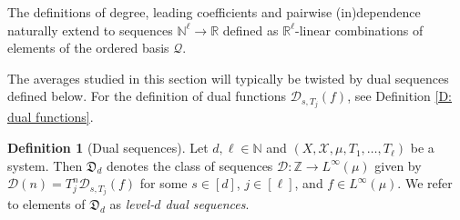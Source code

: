 \documentclass[11pt]{amsart}
\theoremstyle{definition}
\newtheorem{definition}[lemma]{Definition}
\newcommand{\N}{{\mathbb N}}
\newcommand{\R}{{\mathbb R}}
\newcommand{\Z}{{\mathbb Z}}
\newcommand{\CD}{{\mathcal D}}
\newcommand{\CQ}{{\mathcal Q}}
\newcommand{\CX}{{\mathcal X}}
\newcommand{\FD}{{\mathfrak D}}
\newcommand{\1}{{\mathbf{1}}}
\begin{document}
The definitions of degree, leading coefficients and pairwise (in)dependence naturally extend to sequences $\N^\ell\to\R$ defined as $\R^\ell$-linear combinations of elements of the ordered basis $\CQ$.

The averages studied in this section will typically be twisted by dual sequences defined below. For the definition of dual functions $\CD_{s, T_j}(f)$, see Definition \ref{D: dual functions}. 
\begin{definition}[Dual sequences]\label{D: dual sequences}
    Let $d,\ell\in\N$ and $(X, \CX, \mu, T_1, \ldots, T_\ell)$ be a system. Then $\FD_d$ denotes the class of sequences $\CD:\Z\to L^\infty(\mu)$ given by $\CD(n) = T_j^n\CD_{s, T_j}(f)$ for some $s\in[d]$, $j\in[\ell]$, and $f\in L^\infty(\mu)$. We refer to elements of $\FD_d$ as \textit{level-$d$ dual sequences}.
\end{definition}
\end{document}

